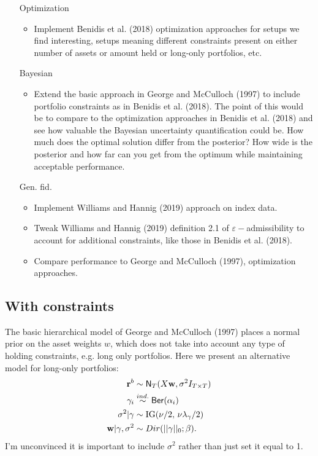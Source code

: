 \documentclass[a4paper, 12pt]{article}
\theoremstyle{plain}
\theoremstyle{definition}
\theoremstyle{remark}
\newcommand{\ber}{{\sf Ber}}
\newcommand{\nm}{{\sf N}}
\newcommand{\eps}{\varepsilon}
\begin{document}
\begin{itemize}
	\item[Optimization]
		\begin{itemize}
		\item Implement Benidis et al. (2018) optimization approaches for setups we find interesting, setups meaning different constraints present on either number of assets or amount held or long-only portfolios, etc.
	\end{itemize}
	\item[Bayesian]
	\begin{itemize}
		\item Extend the basic approach in George and McCulloch (1997) to include portfolio constraints as in Benidis et al. (2018).  The point of this would be to compare to the optimization approaches in Benidis et al. (2018) and see how valuable the Bayesian uncertainty quantification could be.  How much does the optimal solution differ from the posterior?  How wide is the posterior and how far can you get from the optimum while maintaining acceptable performance.
	\end{itemize}
	\item[Gen. fid.]
		\begin{itemize}
			\item Implement Williams and Hannig (2019) approach on index data.
			\item Tweak Williams and Hannig (2019) definition 2.1 of $\eps-$admissibility to account for additional constraints, like those in Benidis et al. (2018).
			\item Compare performance to George and McCulloch (1997), optimization approaches.
	\end{itemize}
\end{itemize}

\subsection{With constraints}

The basic hierarchical model of George and McCulloch (1997) places a normal prior on the asset weights $w$, which does not take into account any type of holding constraints, e.g. long only portfolios.  Here we present an alternative model for long-only portfolios:
\begin{align}
\textbf{r}^b &\sim \nm_{T}(X\textbf{w}, \sigma^2I_{T\times T})\\
\gamma_i &\stackrel{ind.}{\sim} \ber(\alpha_i) \\
\sigma^2 | \gamma & \sim \text{IG}(\nu/2,\,\nu\lambda_\gamma/2)\\
\textbf{w}|\gamma, \sigma^2 & \sim Dir(||\gamma||_0; \beta).
\end{align}
{\color{red} I'm unconvinced it is important to include $\sigma^2$ rather than just set it equal to 1.}
\end{document}
